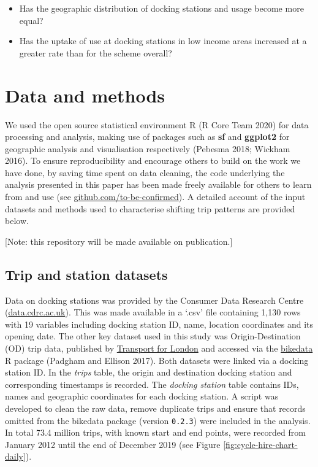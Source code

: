 \documentclass[
]{article}
\providecommand{\tightlist}{%
  \setlength{\itemsep}{0pt}\setlength{\parskip}{0pt}}
\begin{document}
\begin{itemize}
\tightlist
\item
  Has the geographic distribution of docking stations and usage become more equal?
\item
  Has the uptake of use at docking stations in low income areas increased at a greater rate than for the scheme overall?
\end{itemize}

\hypertarget{data-and-methods}{%
\section{Data and methods}\label{data-and-methods}}

We used the open source statistical environment R (R Core Team 2020) for data processing and analysis, making use of packages such as \textbf{sf} and \textbf{ggplot2} for geographic analysis and visualisation respectively (Pebesma 2018; Wickham 2016).
To ensure reproducibility and encourage others to build on the work we have done, by saving time spent on data cleaning, the code underlying the analysis presented in this paper has been made freely available for others to learn from and use (see \href{https://github.com}{github.com/to-be-confirmed}).
A detailed account of the input datasets and methods used to characterise shifting trip patterns are provided below.

{[}Note: this repository will be made available on publication.{]}

\hypertarget{trip-and-station-datasets}{%
\subsection{Trip and station datasets}\label{trip-and-station-datasets}}

Data on docking stations was provided by the Consumer Data Research Centre (\href{https://data.cdrc.ac.uk/product/ffc94eb2-baf0-46f9-bf7d-5e8dd424b95d?accesslevel=open\&q=\&sort=title_string+asc}{data.cdrc.ac.uk}).
This was made available in a `.csv' file containing 1,130 rows with 19 variables including docking station ID, name, location coordinates and its opening date.
The other key dataset used in this study was Origin-Destination (OD) trip data, published by \href{https://cycling.data.tfl.gov.uk}{Transport for London} and accessed via the \href{https://github.com/ropensci/bikedata}{bikedata} R package (Padgham and Ellison 2017).
Both datasets were linked via a docking station ID.
In the \emph{trips} table, the origin and destination docking station and corresponding timestamps is recorded.
The \emph{docking station} table contains IDs, names and geographic coordinates for each docking station.
A script was developed to clean the raw data, remove duplicate trips and ensure that records omitted from the bikedata package (version \texttt{0.2.3}) were included in the analysis.
In total 73.4 million trips, with known start and end points, were recorded from January 2012 until the end of December 2019 (see Figure \ref{fig:cycle-hire-chart-daily}).
\end{document}

